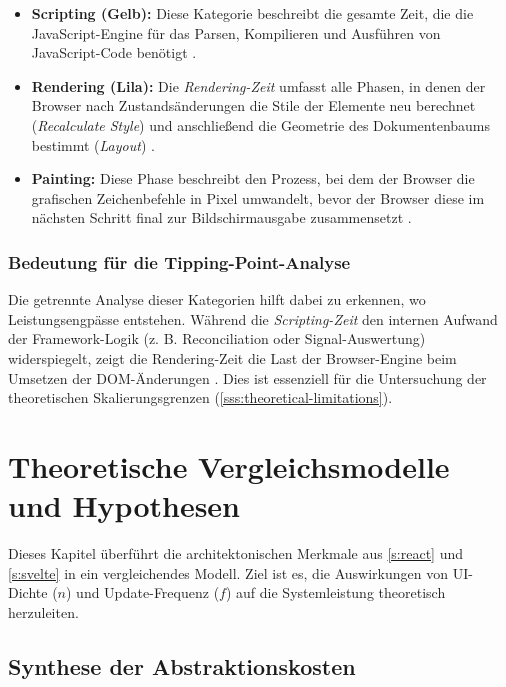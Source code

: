 \begin{itemize}
	\item \textbf{Scripting (Gelb):} Diese Kategorie beschreibt die gesamte Zeit, die die JavaScript-Engine für das Parsen, Kompilieren und Ausführen von JavaScript-Code benötigt \cite{chrome-lighthouse-js-execution-2019, chrome-performance-reference-2024}.
	
	\item \textbf{Rendering (Lila):} Die \textit{Rendering-Zeit} umfasst alle Phasen, in denen der Browser nach Zustandsänderungen die Stile der Elemente neu berechnet (\textit{Recalculate Style}) und anschließend die Geometrie des Dokumentenbaums bestimmt (\textit{Layout}) \cite{chrome-performance-reference-2024}.
	
	\item \textbf{Painting:} Diese Phase beschreibt den Prozess, bei dem der Browser die grafischen Zeichenbefehle in Pixel umwandelt, bevor der Browser diese im nächsten Schritt final zur Bildschirmausgabe zusammensetzt \cite{chromium-frameviewer-howto}. 
\end{itemize}

\subsubsection{Bedeutung für die Tipping-Point-Analyse}

Die getrennte Analyse dieser Kategorien hilft dabei zu erkennen, wo Leistungsengpässe entstehen. Während die \textit{Scripting-Zeit} den internen Aufwand der Framework-Logik (z. B. Reconciliation oder Signal-Auswertung) widerspiegelt, zeigt die Rendering-Zeit die Last der Browser-Engine beim Umsetzen der DOM-Änderungen \cite{chrome-performance-reference-2024, chromium-frameviewer-howto}. Dies ist essenziell für die Untersuchung der theoretischen Skalierungsgrenzen (\cref{sss:theoretical-limitations}).


\section{Theoretische Vergleichsmodelle und Hypothesen}
\label{s:theoretical-models-and-hypotheses}

Dieses Kapitel überführt die architektonischen Merkmale aus \cref{s:react} und \cref{s:svelte} in ein vergleichendes Modell. Ziel ist es, die Auswirkungen von UI-Dichte ($n$) und Update-Frequenz ($f$) auf die Systemleistung theoretisch herzuleiten.

\subsection{Synthese der Abstraktionskosten}
\label{ss:abstraction-costs}

